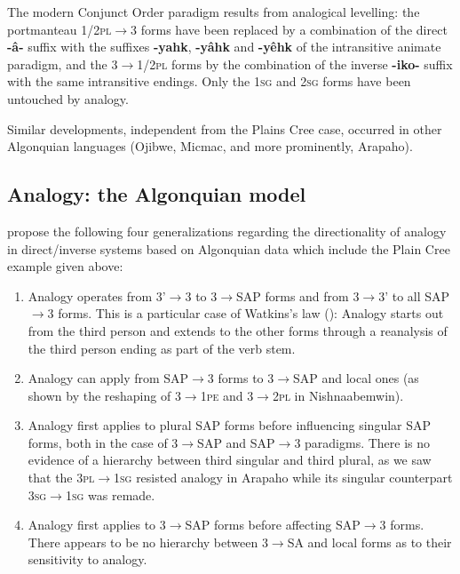\documentclass{article}
\newcommand{\ipa}[1]{{\phon\textbf{#1}}}
\begin{document}
The modern Conjunct Order paradigm results from analogical levelling: the portmanteau \textsc{1/2pl}$\rightarrow$3 forms have been replaced by a combination of the direct \ipa{-â-} suffix with the suffixes \ipa{-yahk}, \ipa{-yâhk}  and \ipa{-yêhk} of the intransitive animate paradigm, and the 3$\rightarrow$\textsc{1/2pl} forms by the combination of the inverse  \ipa{-iko-} suffix with the same intransitive endings. Only the \textsc{1sg} and \textsc{2sg} forms have been untouched by analogy.

Similar developments,  independent from the Plains Cree case, occurred in other Algonquian languages (Ojibwe, Micmac, and more prominently, Arapaho). 
\subsection{Analogy: the Algonquian model} \label{sec:analogy}
\citet{jacques17directionality} propose the following four generalizations regarding the directionality of analogy in direct/inverse systems based on Algonquian data which include the Plain Cree example given above:

\begin{enumerate}
\item Analogy operates from 3'$\rightarrow$3 to 3$\rightarrow$SAP forms and from 3$\rightarrow$3' to all SAP$\rightarrow$3 forms. This is a particular case of   Watkins's law (\citealt{watkins62celtic}): Analogy starts out from the third person and extends to the other forms through a reanalysis of the third person ending as part of the verb stem.
\item Analogy can apply from SAP$\rightarrow$3 forms to 3$\rightarrow$SAP and  local ones (as shown by the reshaping of 3$\rightarrow$1\textsc{pe} and 3$\rightarrow$2\textsc{pl} in Nishnaabemwin).
\item Analogy first applies to plural SAP forms before influencing singular SAP forms, both in the case of 3$\rightarrow$SAP and SAP$\rightarrow$3 paradigms. There is no evidence of a hierarchy between third singular and third plural, as we saw that the \textsc{3pl$\rightarrow$1sg} resisted analogy in Arapaho while its singular counterpart \textsc{3sg$\rightarrow$1sg} was remade.
\item Analogy first applies  to 3$\rightarrow$SAP forms before affecting SAP$\rightarrow$3 forms. There appears  to be no hierarchy between 3$\rightarrow$SA and local forms as to their sensitivity to analogy.
\end{enumerate}
\end{document}
